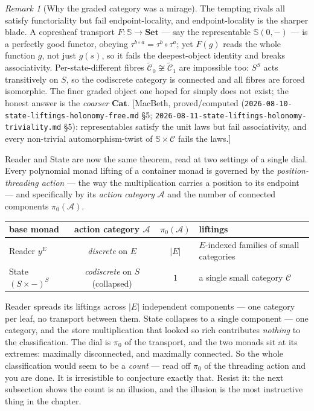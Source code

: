 \documentclass[11pt,a4paper]{book}
\newcommand{\Set}{\mathbf{Set}}
\newcommand{\Cat}{\mathbf{Cat}}
\newcommand{\y}{y}
\theoremstyle{plain}
\theoremstyle{definition}
\theoremstyle{remark}
\newtheorem{Remark}[Theorem]{Remark}
\newcommand{\prov}[1]{\hfill\textsf{\footnotesize[#1]}}
\begin{document}
\begin{Remark}[Why the graded category was a mirage]
The tempting rivals all satisfy functoriality but fail endpoint-locality, and endpoint-locality is
the sharper blade. A copresheaf transport $F\colon\mathbb S\to\Set$ --- say the representable
$\mathbb S(0,-)$ --- is a perfectly good functor, obeying $\tau^{b\circ a}=\tau^{b}\circ\tau^{a}$; yet
$F(g)$ reads the whole function $g$, not just $g(s)$, so it fails the deepest-object identity and
breaks associativity. Per-state-different fibres $\widetilde{\mathcal C}_{0}\not\cong
\widetilde{\mathcal C}_{1}$ are impossible too: $S^{S}$ acts transitively on $S$, so the codiscrete
category is connected and all fibres are forced isomorphic. The finer graded object one hoped for
simply does not exist; the honest answer is the \emph{coarser} $\Cat$.
\prov{MacBeth, proved/computed (\texttt{2026-08-10-state-liftings-holonomy-free.md} §5;
\texttt{2026-08-11-state-liftings-holonomy-triviality.md} §5): representables satisfy the unit laws
but fail associativity, and every non-trivial automorphism-twist of $\mathbb S\times\mathcal C$ fails
the laws.}
\end{Remark}

\begin{teachbox}
Reader and State are now the same theorem, read at two settings of a single dial. Every polynomial
monad lifting of a container monad is governed by the \emph{position-threading action} --- the way the
multiplication carries a position to its endpoint --- and specifically by its \emph{action category}
$\mathcal A$ and the number of connected components $\pi_{0}(\mathcal A)$.
\begin{center}
\renewcommand{\arraystretch}{1.35}
\begin{tabular}{@{}l c c l@{}}
 base monad & action category $\mathcal A$ & $\pi_{0}(\mathcal A)$ & liftings \\\hline
 Reader $\y^{E}$ & \emph{discrete} on $E$ & $|E|$ & $E$-indexed families of small categories\\
 State $(S\times-)^{S}$ & \emph{codiscrete} on $S$ (collapsed) & $1$ & a single small category $\mathcal C$\\
\end{tabular}
\end{center}
Reader spreads its liftings across $|E|$ independent components --- one category per leaf, no transport
between them. State collapses to a single component --- one category, and the store multiplication that
looked so rich contributes \emph{nothing} to the classification. The dial is $\pi_{0}$ of the
transport, and the two monads sit at its extremes: maximally disconnected, and maximally connected.
So the whole classification would seem to be a \emph{count} --- read off $\pi_{0}$ of the threading
action and you are done. It is irresistible to conjecture exactly that. Resist it: the next subsection
shows the count is an illusion, and the illusion is the most instructive thing in the chapter.
\end{teachbox}
\end{document}
